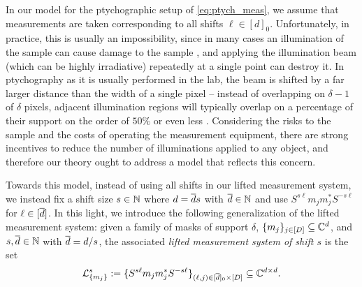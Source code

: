 In our model for the ptychographic setup of \eqref{eq:ptych_meas}, we assume that measurements are taken corresponding to all shifts $\ell \in [d]_0$.  Unfortunately, in practice, this is usually an impossibility, since in many cases an illumination of the sample can cause damage to the sample \cite{starodub2008damage}, and applying the illumination beam (which can be highly irradiative) repeatedly at a single point can destroy it.  In ptychography as it is usually performed in the lab, the beam is shifted by a far larger distance than the width of a single pixel -- instead of overlapping on $\delta - 1$ of $\delta$ pixels, adjacent illumination regions will typically overlap on a percentage of their support on the order of $50\%$ or even less \cite{marchesini2015coptych,shapiro2014nanometer}.  Considering the risks to the sample and the costs of operating the measurement equipment, there are strong incentives to reduce the number of illuminations applied to any object, and therefore our theory ought to address a model that reflects this concern.

Towards this model, instead of using all shifts in our lifted measurement system, we instead fix a shift size $s \in \mathbb{N}$ where $d = \overline{d} s$ with $\overline{d} \in \mathbb{N}$ and use $S^{s \ell} m_j m_j^* S^{-s \ell}$ for $\ell \in [\overline{d}]$.  In this light, we introduce the following generalization of the lifted measurement system: given a family of masks of support $\delta$, $\{m_j\}_{j \in [D]} \subseteq \mathbb{C}^d$, and $s, \overline{d} \in \mathbb{N}$ with $\overline{d} = d / s$, the associated \emph{lifted measurement system of shift $s$} is the set \begin{equation} \mathcal{L}_{\{m_j\}}^s := \{S^{s \ell} m_j m_j^* S^{-s \ell}\}_{(\ell, j) \in [\overline{d}]_0 \times [D]} \subseteq \mathbb{C}^{d \times d}. \label{eq:lift_pty_sys}\end{equation}

